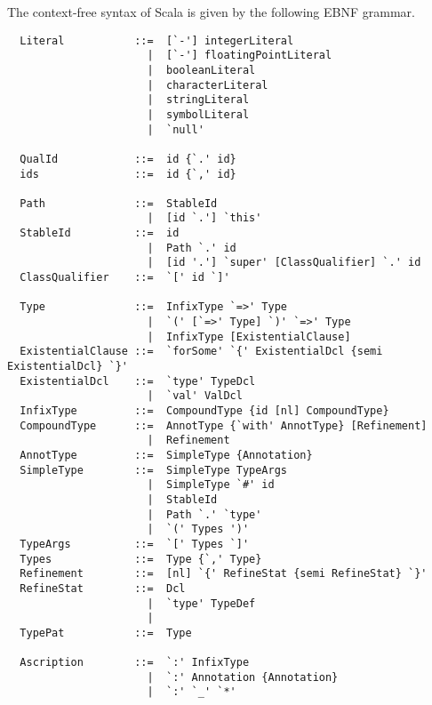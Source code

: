 The context-free syntax of Scala is given by the following EBNF
grammar.

{\small
\begin{lstlisting}
  Literal           ::=  [`-'] integerLiteral
                      |  [`-'] floatingPointLiteral
                      |  booleanLiteral
                      |  characterLiteral
                      |  stringLiteral
                      |  symbolLiteral
                      |  `null'

  QualId            ::=  id {`.' id}
  ids               ::=  id {`,' id}

  Path              ::=  StableId
                      |  [id `.'] `this'
  StableId          ::=  id
                      |  Path `.' id
                      |  [id '.'] `super' [ClassQualifier] `.' id
  ClassQualifier    ::=  `[' id `]'

  Type              ::=  InfixType `=>' Type
                      |  `(' [`=>' Type] `)' `=>' Type
                      |  InfixType [ExistentialClause]
  ExistentialClause ::=  `forSome' `{' ExistentialDcl {semi ExistentialDcl} `}'
  ExistentialDcl    ::=  `type' TypeDcl 
                      |  `val' ValDcl
  InfixType         ::=  CompoundType {id [nl] CompoundType}
  CompoundType      ::=  AnnotType {`with' AnnotType} [Refinement]
                      |  Refinement
  AnnotType         ::=  SimpleType {Annotation}
  SimpleType        ::=  SimpleType TypeArgs
                      |  SimpleType `#' id
                      |  StableId
                      |  Path `.' `type'
                      |  `(' Types ')'
  TypeArgs          ::=  `[' Types `]'
  Types             ::=  Type {`,' Type}
  Refinement        ::=  [nl] `{' RefineStat {semi RefineStat} `}'
  RefineStat        ::=  Dcl
                      |  `type' TypeDef
                      |
  TypePat           ::=  Type

  Ascription        ::=  `:' InfixType
                      |  `:' Annotation {Annotation} 
                      |  `:' `_' `*'


\end{lstlisting}}
